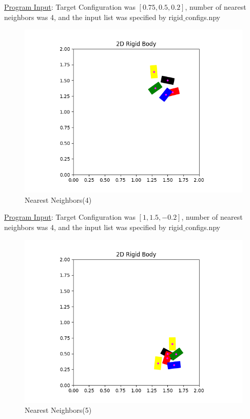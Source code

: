 \documentclass{article}
\begin{document}
\underline{Program Input}: Target Configuration was $[0.75, 0.5, 0.2]$, number of nearest neighbors was 4, and the input list was specified by rigid$\_$configs.npy

\newpage 
\begin{figure}[h!]
	\includegraphics[width= 0.9 \linewidth]{P2_NearestNeighbor(4).png}
	\centering
	\caption{Nearest Neighbors(4)}
	\label{P2_NearestNeighbor(4).png}
\end{figure}

\underline{Program Input}: Target Configuration was $[1, 1.5, -0.2]$, number of nearest neighbors was 4, and the input list was specified by rigid$\_$configs.npy

\newpage
\begin{figure}[h!]
	\includegraphics[width= 0.9 \linewidth]{P2_NearestNeighbor(5).png}
	\centering
	\caption{Nearest Neighbors(5)}
	\label{P2_NearestNeighbor(5).png}
\end{figure}
\end{document}
